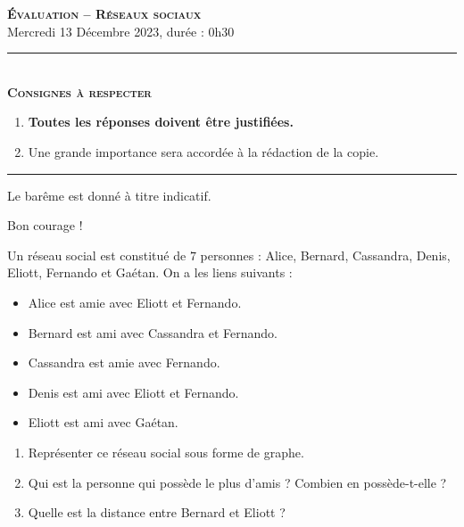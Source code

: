 \documentclass[11pt]{article}
\begin{document}
\begin{center}
\textbf{\LARGE \textsc{Évaluation -- Réseaux sociaux}}\\[2mm]

{\large Mercredi 13 Décembre 2023, durée : 0h30}\\[1mm]
\noindent\rule{8cm}{0.4pt}\\[1mm]
\textbf{\textsc{Consignes à respecter}}
\begin{enumerate}[label=\textbf{\arabic*/}]
\item \textbf{Toutes les réponses doivent être justifiées.}
\item Une grande importance sera accordée à la rédaction de la
  copie.
\end{enumerate}
\noindent\rule{12cm}{0.4pt}
\end{center}

\vspace{2mm}
\noindent Le barême est donné à titre indicatif.
\vspace{2mm}
\begin{center}
  Bon courage !
\end{center}

\begin{exo}[$3$ points]
  Un réseau social est constitué de $7$ personnes : Alice, Bernard, Cassandra,
  Denis, Eliott, Fernando et Gaétan. On a les liens suivants :
  \begin{itemize}
    \item Alice est amie avec Eliott et Fernando.
    \item Bernard est ami avec Cassandra et Fernando.
    \item Cassandra est amie avec Fernando.
    \item Denis est ami avec Eliott et Fernando.
    \item Eliott est ami avec Gaétan.
  \end{itemize}
  \begin{enumerate}
    \item Représenter ce réseau social sous forme de graphe.
    \item Qui est la personne qui possède le plus d'amis ? Combien en
      possède-t-elle ?
    \item Quelle est la distance entre Bernard et Eliott ?
  \end{enumerate}
\end{exo}
\end{document}
